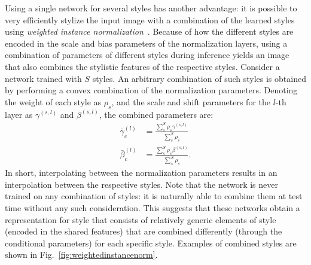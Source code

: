 Using a single network for several styles has another advantage: it is possible to very efficiently stylize the input image with a combination of the learned styles using \textit{weighted instance normalization}~\cite{dumoulin2016learned}. Because of how the different styles are encoded in the scale and bias parameters of the normalization layers, using a combination of parameters of different styles during inference yields an image that also combines the stylistic features of the respective styles. Consider a network trained with $S$ styles. An arbitrary combination of such styles is obtained by performing a convex combination of the normalization parameters. Denoting the weight of each style as $\rho_s$, and the scale and shift parameters for the $l$-th layer as $\gamma^{(s,l)}$ and $\beta^{(s,l)}$, the combined parameters are:
\begin{equation}
\begin{split}
\bar{\gamma}^{(l)}_c &= \frac{\sum_{s}^{S}\rho_s\gamma^{(s,l)}}{\sum_{s}^{S}\rho_s}\\
\bar{\beta}^{(l)}_c &= \frac{\sum_{s}^{S}\rho_s\beta^{(s,l)}}{\sum_{s}^{S}\rho_s}.
\end{split}
\end{equation}
In short, interpolating between the normalization parameters results in an interpolation between the respective styles. Note that the network is never trained on any combination of styles: it is naturally able to combine them at test time without any such consideration. This suggests that these networks obtain a representation for style that consists of relatively generic elements of style (encoded in the shared features) that are combined differently (through the conditional parameters) for each specific style. Examples of combined styles are shown in Fig.~\ref{fig:weightedinstancenorm}.

